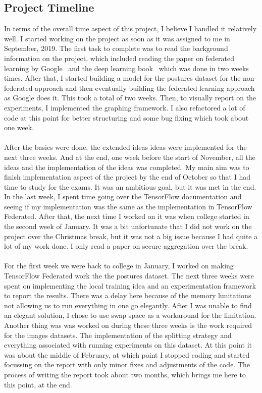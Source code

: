 \documentclass[12pt]{article}
\newcommand{\comment}[1]{}
\begin{document}
\subsection{Project Timeline}
\comment{
	reglection subsection
		what did I learn, new skills, short comings (skill, method, time)
	summary of project conduction
		timeline 
}
In terms of the overall time aspect of this project, I believe I handled it relatively well. I started working on the project as soon as it was assigned to me in September, 2019. The first task to complete was to read the background information on the project, which included reading the paper on federated learning by Google~\cite{mcmahan2016communication} and the deep learning book~\cite{deeplearning} which was done in two weeks times. After that, I started building a model for the postures dataset for the non-federated approach and then eventually building the federated learning approach as Google does it. This took a total of two weeks. Then, to visually report on the experiments, I implemented the graphing framework. I also refactored a lot of code at this point for better structuring and some bug fixing which took about one week.
\\\\
After the basics were done, the extended ideas ideas were implemented for the next three weeks. And at the end, one week before the start of November, all the ideas and the implementation of the ideas was completed. My main aim was to finish implementation aspect of the project by the end of October so that I had time to study for the exams. It was an ambitious goal, but it was met in the end. In the last week, I spent time going over the TensorFlow documentation and seeing if my implementation was the same as the implementation in TensorFlow Federated. After that, the next time I worked on it was when college started in the second week of January. It was a bit unfortunate that I did not work on the project over the Christmas break, but it was not a big issue because I had quite a lot of my work done. I only read a paper on secure aggregation over the break.
\\\\
For the first week we were back to college in January, I worked on making TensorFlow Federated work the the postures dataset. The next three weeks were spent on implementing the local training idea and an experimentation framework to report the results. There was a delay here because of the memory limitations not allowing us to run everything in one go elegantly. After I was unable to find an elegant solution, I chose to use swap space as a workaround for the limitation. Another thing was was worked on during these three weeks is the work required for the images datasets. The implementation of the splitting strategy and everything associated with running experiments on this dataset. At this point it was about the middle of February, at which point I stopped coding and started focussing on the report with only minor fixes and adjustments of the code. The process of writing the report took about two months, which brings me here to this point, at the end.
\comment{
	basic thing
	read book
	google implementation
	better graphinh 
	extended ideas
	repreodcuible
	testing
	results
	report - 2 months 
}
\clearpage
\printbibliography[title={Bibliography}]
\end{document}
